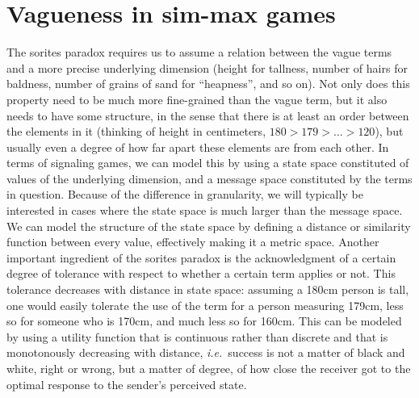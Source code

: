 \documentclass[a4paper]{article}
\begin{document}
\section{Vagueness in sim-max games}
\label{sec:sim-max-vagueness}

The sorites paradox requires us to assume a relation between the vague terms and a more precise underlying dimension (height for tallness, number of hairs for baldness, number of grains of sand for ``heapness'', and so on).
Not only does this property need to be much more fine-grained than the vague term, but it also needs to have some structure, in the sense that there is at least an order between the elements in it (thinking of height in centimeters, $180 > 179 > \ldots > 120$), but usually even a degree of how far apart these elements are from each other.
In terms of signaling games, we can model this by using a state space constituted of values of the underlying dimension, and a message space constituted by the terms in question.
Because of the difference in granularity, we will typically be interested in cases where the state space is much larger than the message space.
We can model the structure of the state space by defining a distance or similarity function between every value, effectively making it a metric space.
Another important ingredient of the sorites paradox is the acknowledgment of a certain degree of tolerance with respect to whether a certain term applies or not.
This tolerance decreases with distance in state space: assuming a 180cm person is tall, one would easily tolerate the use of the term for a person measuring 179cm, less so for someone who is 170cm, and much less so for 160cm.
This can be modeled by using a utility function that is continuous rather than discrete and that is monotonously decreasing with distance, \emph{i.e.}~success is not a matter of black and white, right or wrong, but a matter of degree, of how close the receiver got to the optimal response to the sender's perceived state.
\end{document}

